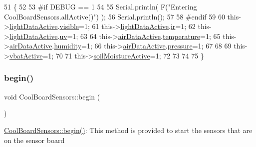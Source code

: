 \begin{DoxyCode}
51 \{
52 
53 \textcolor{preprocessor}{#if DEBUG == 1 }
54 
55     Serial.println( F(\textcolor{stringliteral}{"Entering CoolBoardSensors.allActive()"}) );
56     Serial.println();
57 
58 \textcolor{preprocessor}{#endif}
59     
60     this->\hyperlink{class_cool_board_sensors_ac4deb1cf41bac8b91c780c92fab00ba4}{lightDataActive}.\hyperlink{struct_cool_board_sensors_1_1light_active_abcbba296b6a95e67c0cd2555d9dd50c7}{visible}=1;
61     this->\hyperlink{class_cool_board_sensors_ac4deb1cf41bac8b91c780c92fab00ba4}{lightDataActive}.\hyperlink{struct_cool_board_sensors_1_1light_active_a67700895349b95ceb263f1a6da756315}{ir}=1;
62     this->\hyperlink{class_cool_board_sensors_ac4deb1cf41bac8b91c780c92fab00ba4}{lightDataActive}.\hyperlink{struct_cool_board_sensors_1_1light_active_a949a7aaf5166d981de8fe0fd93da20d6}{uv}=1;    
63 
64     this->\hyperlink{class_cool_board_sensors_abff8dfeccb2f7689847bb64d5f1cd31e}{airDataActive}.\hyperlink{struct_cool_board_sensors_1_1air_active_a9a6633c426b0508e30ebc1832ec6d745}{temperature}=1;
65     this->\hyperlink{class_cool_board_sensors_abff8dfeccb2f7689847bb64d5f1cd31e}{airDataActive}.\hyperlink{struct_cool_board_sensors_1_1air_active_ae5740445054b27415e22f450576accb7}{humidity}=1;
66     this->\hyperlink{class_cool_board_sensors_abff8dfeccb2f7689847bb64d5f1cd31e}{airDataActive}.\hyperlink{struct_cool_board_sensors_1_1air_active_ab200826a70d1dc9945f5efb6b9c732ed}{pressure}=1;
67 
68 
69     this->\hyperlink{class_cool_board_sensors_af5039ad760b0ff0aa7eee16c55e81702}{vbatActive}=1;
70 
71     this->\hyperlink{class_cool_board_sensors_a31983eecc0f9cd000e1f912206ea4dc8}{soilMoistureActive}=1;
72     
73 
74 
75 \}
\end{DoxyCode}
\mbox{\label{class_cool_board_sensors_a97095823ef7c8f5290812f1405b966b3}} 
\subsubsection{\texorpdfstring{begin()}{begin()}}
{\footnotesize\ttfamily void Cool\+Board\+Sensors\+::begin (\begin{DoxyParamCaption}{ }\end{DoxyParamCaption})}

\hyperlink{class_cool_board_sensors_a97095823ef7c8f5290812f1405b966b3}{Cool\+Board\+Sensors\+::begin()}\+: This method is provided to start the sensors that are on the sensor board 

